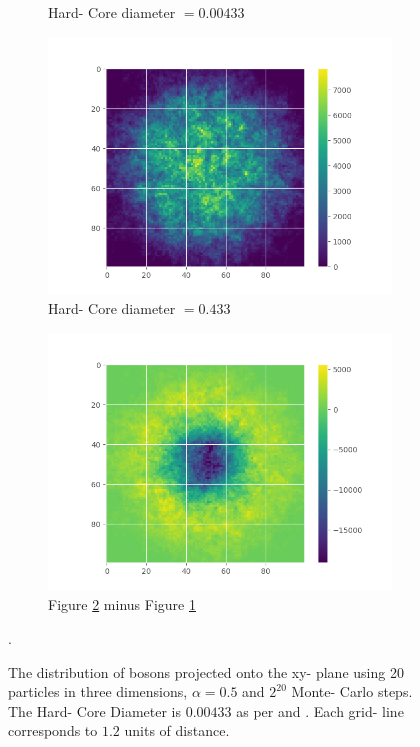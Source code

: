 \documentclass[11pt,a4paper,titlepage]{article}
\begin{document}
\begin{figure}[H]
\begin{subfigure}{.5\textwidth}
\caption{Hard- Core diameter $= 0.00433$}\label{J2}
\end{subfigure}
\begin{subfigure}{.5\textwidth}
  \centering
\includegraphics[trim=3cm 0.0cm 1.5cm 0.0cm, clip=true,scale = 0.45]{LargeJastrow_20.png}
\caption{Hard- Core diameter $= 0.433$}\label{J3}
\end{subfigure}%
\begin{subfigure}{.5\textwidth}
  \centering
\includegraphics[trim=3cm 0.0cm 1.5cm 0.0cm, clip=true,scale = 0.45]{LargeJastrow_minus_Jastrow_20.png}
\caption{Figure \ref{J3} minus Figure \ref{J2}}\label{J4}
\end{subfigure}

\caption[Effect of the Jastrow factor on the XY- distribution of bosons]{The distribution of bosons projected onto the xy- plane using 20 particles in three dimensions, $\alpha = 0.5$ and $2^{20}$ Monte- Carlo steps. The Hard- Core Diameter is $0.00433$ as per \cite{DuBois_2001} and \cite{Nilsen_2005}. Each grid- line corresponds to $1.2$ units of distance.}.
\label{fig:Jastrows}
\end{figure}
\end{document}
